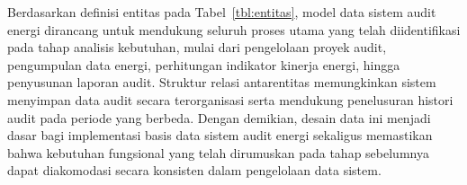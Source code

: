 

Berdasarkan definisi entitas pada Tabel~\ref{tbl:entitas}, model data sistem audit energi dirancang untuk mendukung seluruh proses utama yang telah diidentifikasi pada tahap analisis kebutuhan, mulai dari pengelolaan proyek audit, pengumpulan data energi, perhitungan indikator kinerja energi, hingga penyusunan laporan audit. Struktur relasi antarentitas memungkinkan sistem menyimpan data audit secara terorganisasi serta mendukung penelusuran histori audit pada periode yang berbeda. Dengan demikian, desain data ini menjadi dasar bagi implementasi basis data sistem audit energi sekaligus memastikan bahwa kebutuhan fungsional yang telah dirumuskan pada tahap sebelumnya dapat diakomodasi secara konsisten dalam pengelolaan data sistem.